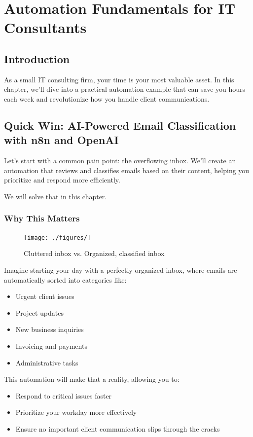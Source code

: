 \chapter{Automation Fundamentals for IT Consultants}



\section{Introduction}

As a small IT consulting firm, your time is your most valuable asset. In this chapter, we'll dive into a practical automation example that can save you hours each week and revolutionize how you handle client communications.


\section{Quick Win: AI-Powered Email Classification with n8n and OpenAI}

Let's start with a common pain point: the overflowing inbox. We'll create an automation that reviews and classifies emails based on their content, helping you prioritize and respond more efficiently.

We will solve that in this chapter.

\subsection{Why This Matters}

\begin{figure}[h]
    \centering
    \texttt{[image: ./figures/]}
    \caption{Cluttered inbox vs. Organized, classified inbox}
\end{figure}

Imagine starting your day with a perfectly organized inbox, where emails are automatically sorted into categories like:

\begin{itemize}
    \item Urgent client issues
    \item Project updates
    \item New business inquiries
    \item Invoicing and payments
    \item Administrative tasks
\end{itemize}

This automation will make that a reality, allowing you to:
\begin{itemize}
    \item Respond to critical issues faster
    \item Prioritize your workday more effectively
    \item Ensure no important client communication slips through the cracks
\end{itemize}

